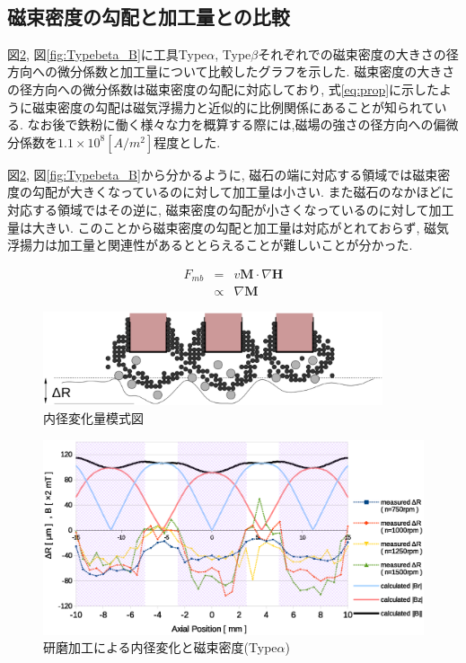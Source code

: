 \documentclass[11pt]{jarticle}
\begin{document}
　\subsection{磁束密度の勾配と加工量との比較}
図\ref{fig:Typealpha_B}, 図\ref{fig:Typebeta_B}に工具Type$\alpha$, Type$\beta$それぞれでの磁束密度の大きさの径方向への微分係数と加工量について比較したグラフを示した. 磁束密度の大きさの径方向への微分係数は磁束密度の勾配に対応しており, 式\ref{eq:prop}に示したように磁束密度の勾配は磁気浮揚力と近似的に比例関係にあることが知られている\cite{磁性流体}. なお後で鉄粉に働く様々な力を概算する際には,磁場の強さの径方向への偏微分係数を$1.1\times10^8[A/m^2]$程度とした. \par
図\ref{fig:Typealpha_B}, 図\ref{fig:Typebeta_B}から分かるように, 磁石の端に対応する領域では磁束密度の勾配が大きくなっているのに対して加工量は小さい. また磁石のなかほどに対応する領域ではその逆に, 磁束密度の勾配が小さくなっているのに対して加工量は大きい. このことから磁束密度の勾配と加工量は対応がとれておらず, 磁気浮揚力は加工量と関連性があるととらえることが難しいことが分かった. 

  \begin{eqnarray}
    F_{mb} & = &  v \bm{M} \cdot \nabla \bm{H} \nonumber \\
               & \propto &  \nabla \bm{M} \label{eq:prop}
  \end{eqnarray}

  \begin{figure}[H]
    \begin{center}
      \includegraphics[width=100mm]{deltaR_sd.eps}
    \end{center}
    \caption{内径変化量模式図}
    \label{fig:deltaR_sd}
  \end{figure}

  \begin{figure}[H]
    \begin{center}
      \includegraphics[width=150mm]{Typealpha_B.eps}
    \end{center}
    \caption{研磨加工による内径変化と磁束密度(Type$\alpha$)}
    \label{fig:Typealpha_B}
  \end{figure}
\end{document}
